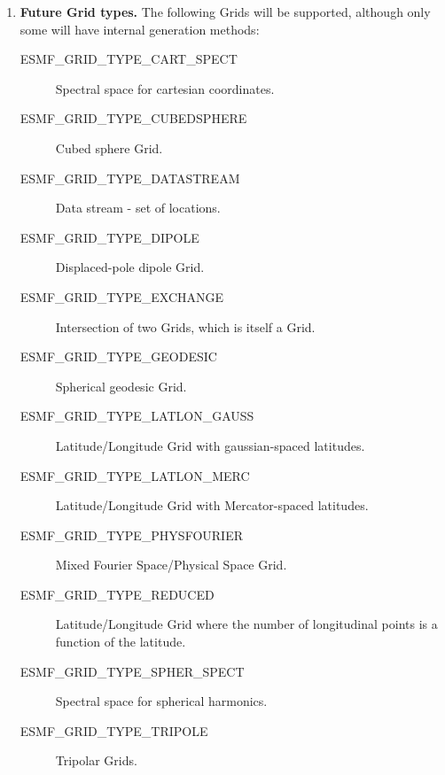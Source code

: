 \begin{enumerate}
\item {\bf Future Grid types.}  The following Grids will
be supported, although only some will have internal generation 
methods:
 \begin{description}
    \item [ESMF\_GRID\_TYPE\_CART\_SPECT]
          Spectral space for cartesian coordinates.
    \item [ESMF\_GRID\_TYPE\_CUBEDSPHERE]
          Cubed sphere Grid.
    \item [ESMF\_GRID\_TYPE\_DATASTREAM]
          Data stream - set of locations.
    \item [ESMF\_GRID\_TYPE\_DIPOLE]
          Displaced-pole dipole Grid.
    \item [ESMF\_GRID\_TYPE\_EXCHANGE]
          Intersection of two Grids, which is itself a Grid.
    \item [ESMF\_GRID\_TYPE\_GEODESIC]
          Spherical geodesic Grid.
    \item [ESMF\_GRID\_TYPE\_LATLON\_GAUSS]
          Latitude/Longitude Grid with gaussian-spaced latitudes.
    \item [ESMF\_GRID\_TYPE\_LATLON\_MERC]
          Latitude/Longitude Grid with Mercator-spaced latitudes.
    \item [ESMF\_GRID\_TYPE\_PHYSFOURIER]
          Mixed Fourier Space/Physical Space Grid.
    \item [ESMF\_GRID\_TYPE\_REDUCED]
          Latitude/Longitude Grid where the number of longitudinal points is a
          function of the latitude.
    \item [ESMF\_GRID\_TYPE\_SPHER\_SPECT]
          Spectral space for spherical harmonics.
    \item [ESMF\_GRID\_TYPE\_TRIPOLE]
          Tripolar Grids.
 \end{description}


\end{enumerate}
